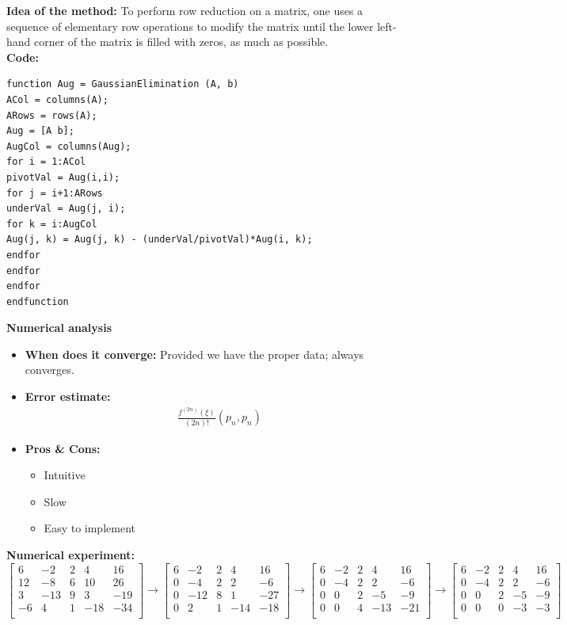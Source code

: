 \documentclass{article}
\begin{document}
{\bf Idea of the method:} 
To perform row reduction on a matrix, one uses a sequence of elementary row operations to modify the matrix until the lower left-hand corner of the matrix is filled with zeros, as much as possible.
{\\\bf Code:}
\begin{verbatim}
function Aug = GaussianElimination (A, b)
ACol = columns(A);
ARows = rows(A);
Aug = [A b];
AugCol = columns(Aug);
for i = 1:ACol
pivotVal = Aug(i,i);
for j = i+1:ARows
underVal = Aug(j, i);
for k = i:AugCol
Aug(j, k) = Aug(j, k) - (underVal/pivotVal)*Aug(i, k);
endfor
endfor
endfor
endfunction
\end{verbatim}
{\bf Numerical analysis}
\begin{itemize}
	\item{\bf When does it converge:} Provided we have the proper data; always converges.
	\item {\bf Error estimate:}
	\begin{equation}
	\begin{split}
	&\frac { f ^ { ( 2 n ) } ( \xi ) } { ( 2 n ) ! } \left( p _ { n } , p _ { n } \right)
	\end{split}
	\end{equation}
	\item {\bf Pros \& Cons:}
	\begin{itemize}
		\item Intuitive
		\item Slow
		\item Easy to implement
	\end{itemize}
\end{itemize}
{\bf Numerical experiment:}
$\left[
\begin{array}{cccc|c}
6 & -2 & 2 & 4 & 16 \\
12 & -8 & 6 & 10 & 26 \\
3 & -13 & 9 & 3 & -19 \\
-6 & 4 & 1 & -18 & -34\\
\end{array}
\right]
\rightarrow
\left[
\begin{array}{cccc|c}
6 & -2 & 2 & 4 & 16 \\
0 & -4 & 2 & 2 & -6 \\
0 & -12 & 8 & 1 & -27 \\
0 & 2 & 1 & -14 & -18\\
\end{array}
\right]
\rightarrow
\left[
\begin{array}{cccc|c}
6 & -2 & 2 & 4 & 16 \\
0 & -4 & 2 & 2 & -6 \\
0 & 0 & 2 & -5 & -9 \\
0 & 0 & 4 & -13 & -21\\
\end{array}
\right]
\rightarrow
\left[
\begin{array}{cccc|c}
6 & -2 & 2 & 4 & 16 \\
0 & -4 & 2 & 2 & -6 \\
0 & 0 & 2 & -5 & -9 \\
0 & 0 & 0 & -3 & -3\\
\end{array}
\right]
$
\end{document}
